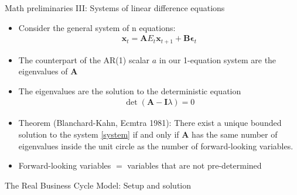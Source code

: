 \documentclass[9pt,xcolor={dvipsnames}]{beamer}
\newcommand{\bit}{\begin{itemize}}
\newcommand{\eit}{\end{itemize}}
\newcommand{\bc}{\color{blue}}
\newcommand{\lb}{\label}
\begin{document}
\begin{frame}{Math preliminaries III: Systems of linear difference equations}

\bit
\setlength\itemsep{1.5em}

\item Consider the general system of n equations:
\begin{eqnarray}
\lb{system}
\mathbf{x}_{t} = \mathbf A E_t \mathbf x_{t+1} + \mathbf {B} \mathbf \epsilon_t
\end{eqnarray}

\item The counterpart of the AR(1) scalar $a$ in our 1-equation system are the eigenvalues of $\mathbf{A}$ 

\item The eigenvalues are the solution to the deterministic equation
\begin{eqnarray}
\det(\mathbf{A}-\mathbf{I}\lambda) = 0  \nonumber
\end{eqnarray}

\item Theorem (Blanchard-Kahn, Ecmtra 1981): There exist a {\bc unique bounded solution} to the system \eqref{system} if and only if $\mathbf{A}$ has the {\bc same number of eigenvalues  inside the unit circle as the number of forward-looking variables.}

\item Forward-looking variables $=$ variables that are not pre-determined

\eit

\end{frame}

\begin{frame}

\begin{center}
	\huge The Real Business Cycle Model: Setup and solution \normalfont
\end{center}

\end{frame}
\end{document}
